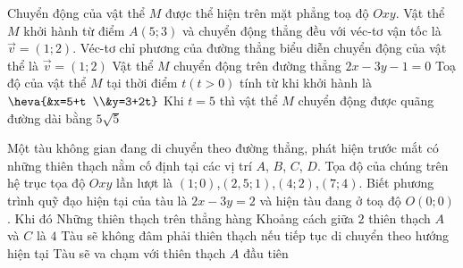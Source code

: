 \begin{ex}%
	Chuyển động của vật thể $M$ được thể hiện trên mặt phẳng toạ độ $Oxy$. Vật thể $M$ khởi hành từ điểm $A(5; 3)$ và chuyển động thẳng đều với véc-tơ vận tốc là $\overrightarrow{v}=(1; 2)$. 
	\choiceTF
	{\True Véc-tơ chỉ phương của đường thẳng biểu diễn chuyển động của vật thể là $\overrightarrow{v}=(1; 2)$}
	{\True Vật thể $M$ chuyển động trên đường thẳng $2x-3y-1=0$}
	{Toạ độ của vật thể $M$ tại thời điểm $t(t > 0)$ tính từ khi khởi hành là $\heva{&x=5+t \\&y=3+2t}$}
	{\True Khi $t=5$ thì vật thể $M$ chuyển động được quãng đường dài bằng $5\sqrt{5}$}
\end{ex}

\begin{ex}%
	Một tàu không gian đang di chuyển theo đường thẳng, phát hiện trước mắt có những thiên thạch nằm cố định tại các vị trí $A$, $B$, $C$, $D$.  Tọa độ của chúng trên hệ trục tọa độ $Oxy$ lần lượt là $(1;0)$,$(2{,}5;1)$,$(4;2)$,$(7;4)$. Biết phương trình quỹ đạo hiện tại của tàu là $2x-3y=2$ và hiện tàu đang ở toạ độ $O(0;0)$. Khi đó
	\choiceTF
	{\True Những thiên thạch trên thẳng hàng}
	{Khoảng cách giữa $2$ thiên thạch $A$ và $C$ là $4$}
	{Tàu sẽ không đâm phải thiên thạch nếu tiếp tục di chuyển theo hướng hiện tại}
	{\True Tàu sẽ va chạm với thiên thạch $A$ đầu tiên}
\end{ex}

